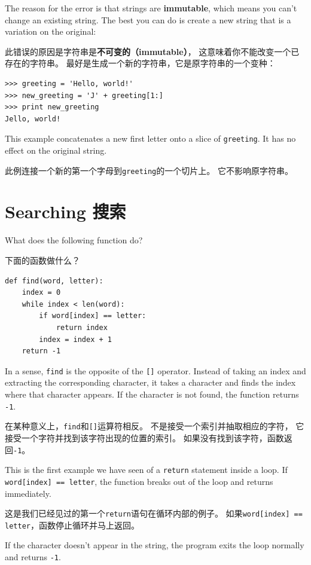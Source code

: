 \documentclass[10pt]{book}
\begin{document}
\begin{CJK}{UTF8}{gbsn}
The reason for the error is that
strings are {\bf immutable}, which means you can't change an
existing string.  The best you can do is create a new string
that is a variation on the original:

此错误的原因是字符串是{\bf 不可变的（immutable）}，
这意味着你不能改变一个已存在的字符串。
最好是生成一个新的字符串，它是原字符串的一个变种：

\begin{verbatim}
>>> greeting = 'Hello, world!'
>>> new_greeting = 'J' + greeting[1:]
>>> print new_greeting
Jello, world!
\end{verbatim}
%
This example concatenates a new first letter onto
a slice of {\tt greeting}.  It has no effect on
the original string.

此例连接一个新的第一个字母到{\tt greeting}的一个切片上。
它不影响原字符串。

\section{Searching 搜索}
\label{find}

What does the following function do?

下面的函数做什么？

\begin{verbatim}
def find(word, letter):
    index = 0
    while index < len(word):
        if word[index] == letter:
            return index
        index = index + 1
    return -1
\end{verbatim}
%
In a sense, {\tt find} is the opposite of the {\tt []} operator.
Instead of taking an index and extracting the corresponding character,
it takes a character and finds the index where that character
appears.  If the character is not found, the function returns {\tt
-1}.

在某种意义上，{\tt find}和{\tt []}运算符相反。
不是接受一个索引并抽取相应的字符，
它接受一个字符并找到该字符出现的位置的索引。
如果没有找到该字符，函数返回{\tt -1}。

This is the first example we have seen of a {\tt return} statement
inside a loop.  If {\tt word[index] == letter}, the function breaks
out of the loop and returns immediately.

这是我们已经见过的第一个{\tt return}语句在循环内部的例子。
如果{\tt word[index] == letter}，函数停止循环并马上返回。

If the character doesn't appear in the string, the program
exits the loop normally and  returns {\tt -1}.


\end{CJK}
\end{document}
